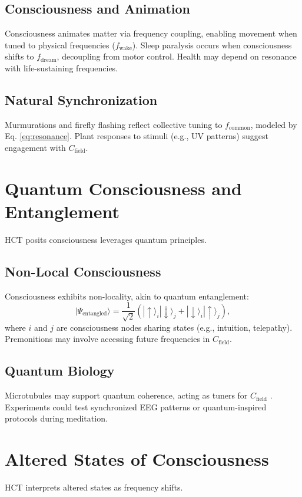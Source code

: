 \documentclass[a4paper,12pt]{article}
\begin{document}
\subsection{Consciousness and Animation}
Consciousness animates matter via frequency coupling, enabling movement when tuned to physical frequencies ($f_{\text{wake}}$). Sleep paralysis occurs when consciousness shifts to $f_{\text{dream}}$, decoupling from motor control. Health may depend on resonance with life-sustaining frequencies.

\subsection{Natural Synchronization}
Murmurations and firefly flashing reflect collective tuning to $f_{\text{common}}$, modeled by Eq. \ref{eq:resonance}. Plant responses to stimuli (e.g., UV patterns) suggest engagement with $C_{\text{field}}$.

\section{Quantum Consciousness and Entanglement}
\label{sec:quantum}
HCT posits consciousness leverages quantum principles.

\subsection{Non-Local Consciousness}
Consciousness exhibits non-locality, akin to quantum entanglement:
\begin{equation}
|\Psi_{\text{entangled}}\rangle = \frac{1}{\sqrt{2}} (|\uparrow\rangle_i |\downarrow\rangle_j + |\downarrow\rangle_i |\uparrow\rangle_j),
\label{eq:entanglement}
\end{equation}
where $i$ and $j$ are consciousness nodes sharing states (e.g., intuition, telepathy). Premonitions may involve accessing future frequencies in $C_{\text{field}}$.

\subsection{Quantum Biology}
Microtubules may support quantum coherence, acting as tuners for $C_{\text{field}}$ \citep{PenroseHameroff1996}. Experiments could test synchronized EEG patterns or quantum-inspired protocols during meditation.

\section{Altered States of Consciousness}
\label{sec:altered_states}
HCT interprets altered states as frequency shifts.
\end{document}
